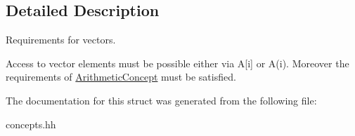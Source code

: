 \subsection{Detailed Description}
Requirements for vectors. 

Access to vector elements must be possible either via A\mbox{[}i\mbox{]} or A(i). Moreover the requirements of \hyperlink{structRFFGen_1_1Concepts_1_1ArithmeticConcept}{Arithmetic\-Concept} must be satisfied. 

The documentation for this struct was generated from the following file\-:\begin{DoxyCompactItemize}
\item 
concepts.\-hh\end{DoxyCompactItemize}
